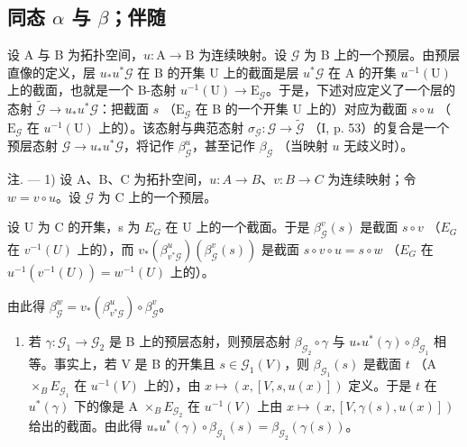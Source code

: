 \subsection{\texorpdfstring{同态 \(\alpha\) 与 \(\beta\)；伴随}{同态 alpha 与 beta；伴随}}

设 A 与 B 为拓扑空间，\(u\colon\mathrm{A}\to\mathrm{B}\) 为连续映射。设 \(\mathcal{G}\) 为 B 上的一个预层。由预层直像的定义，层 \(u_{*}u^{*}\mathcal{G}\) 在 B 的开集 U 上的截面是层 \(u^{*}\mathcal{G}\) 在 A 的开集 \(u^{-1}(\mathrm{U})\) 上的截面，也就是一个 B-态射 \(u^{-1}(\mathrm{U})\to\mathrm{E}_{\mathcal{G}}\)。于是，下述对应定义了一个层的态射 \(\widetilde{\mathcal{G}}\to u_{*}u^{*}\mathcal{G}\)：把截面 \(s\) （\(\mathrm{E}_{\mathcal{G}}\) 在 B 的一个开集 U 上的）对应为截面 \(s\circ u\) （\(\mathrm{E}_{\mathcal{G}}\) 在 \(u^{-1}(\mathrm{U})\) 上的）。该态射与典范态射 \(\sigma_{\mathcal{G}}\colon\mathcal{G}\to\widetilde{\mathcal{G}}\) （I, p. 53）的复合是一个预层态射 \(\mathcal{G}\to u_{*}u^{*}\mathcal{G}\)，将记作 \(\beta_{\mathcal{G}}^{u}\)，甚至记作 \(\beta_{\mathcal{G}}\) （当映射 \(u\) 无歧义时）。

注. --- 1) 设 A、B、C 为拓扑空间，\(u\colon A \to B\)、\(v\colon B \to C\) 为连续映射；令 \(w = v \circ u\)。设 \(\mathcal{G}\) 为 C 上的一个预层。

设 U 为 C 的开集，s 为 \(E_{G}\) 在 U 上的一个截面。于是 \(\beta_{\mathcal{G}}^{v}(s)\) 是截面 \(s \circ v\) （\(E_{G}\) 在 \(v^{-1}(U)\) 上的），而 \(v_{*}(\beta_{v^{*}\mathcal{G}}^{u})(\beta_{\mathcal{G}}^{v}(s))\) 是截面 \(s \circ v \circ u = s \circ w\) （\(E_{G}\) 在 \(u^{-1}(v^{-1}(U)) = w^{-1}(U)\) 上的）。

由此得 \(\beta_{\mathcal{G}}^{w} = v_{*}(\beta_{v^{*}\mathcal{G}}^{u})\circ \beta_{\mathcal{G}}^{v}\)。

\begin{enumerate}
\def\labelenumi{\arabic{enumi})}
\setcounter{enumi}{1}
\tightlist
\item
  若 \(\gamma\colon\mathcal{G}_{1}\to\mathcal{G}_{2}\) 是 B 上的预层态射，则预层态射 \(\beta_{\mathcal{G}_{2}}\circ\gamma\) 与 \(u_{*}u^{*}(\gamma)\circ\beta_{\mathcal{G}_{1}}\) 相等。事实上，若 V 是 B 的开集且 \(s\in\mathcal{G}_{1}(V)\)，则 \(\beta_{\mathcal{G}_{1}}(s)\) 是截面 \(t\) （A \(\times_{B}E_{\mathcal{G}_{1}}\) 在 \(u^{-1}(V)\) 上的），由 \(x\mapsto(x,[V,s,u(x)])\) 定义。于是 \(t\) 在 \(u^{*}(\gamma)\) 下的像是 A \(\times_{B}E_{\mathcal{G}_{2}}\) 在 \(u^{-1}(V)\) 上由 \(x\mapsto(x,[V,\gamma(s),u(x)])\) 给出的截面。由此得 \(u_{*}u^{*}(\gamma)\circ\beta_{\mathcal{G}_{1}}(s)=\beta_{\mathcal{G}_{2}}(\gamma(s))\)。
\end{enumerate}

